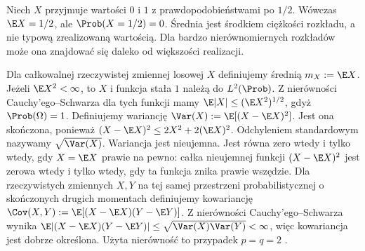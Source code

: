 \begin{przyklad}
Niech $X$ przyjmuje wartości $0$ i $1$ z prawdopodobieństwami
po $1/2$. Wówczas $\E X=1/2$, ale $\Prob(X=1/2)=0$.
Średnia jest środkiem ciężkości rozkładu, a nie typową
zrealizowaną wartością. Dla bardzo nierównomiernych rozkładów
może ona znajdować się daleko od większości realizacji.
\end{przyklad}

\begin{definicja}
Dla całkowalnej rzeczywistej zmiennej losowej $X$
definiujemy średnią $m_X:=\E X$. Jeżeli $\E X^2<\infty$, to $X$ i funkcja stała $1$
należą do $L^2(\Prob)$. Z nierówności
Cauchy'ego--Schwarza dla tych funkcji mamy
$\E|X|\leq(\E X^2)^{1/2}$, gdyż $\Prob(\Omega)=1$.
Definiujemy wariancję $\Var(X):=\E[(X-\E X)^2]$.
Jest ona skończona, ponieważ
$(X-\E X)^2\leq 2X^2+2(\E X)^2$.
Odchyleniem standardowym nazywamy $\sqrt{\Var(X)}$.
Wariancja jest nieujemna. Jest równa zero wtedy i tylko wtedy,
gdy $X=\E X$ prawie na pewno: całka nieujemnej funkcji
$(X-\E X)^2$ jest zerowa wtedy i tylko wtedy, gdy ta funkcja
znika prawie wszędzie.
Dla rzeczywistych zmiennych $X,Y$ na tej samej przestrzeni
probabilistycznej o skończonych drugich momentach definiujemy
kowariancję $\Cov(X,Y):=\E[(X-\E X)(Y-\E Y)]$.
Z nierówności Cauchy'ego--Schwarza wynika
$\E|(X-\E X)(Y-\E Y)|\leq
\sqrt{\Var(X)\Var(Y)}<\infty$, więc kowariancja jest
dobrze określona. Użyta nierówność to przypadek $p=q=2$
.
\end{definicja}

